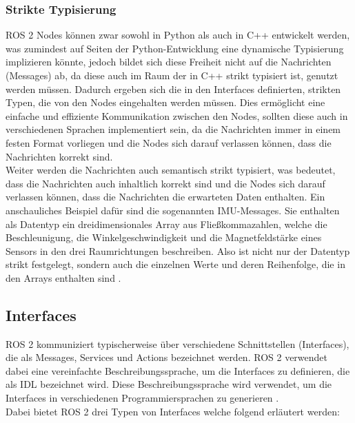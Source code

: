 \subsubsection{Strikte Typisierung}\label{subsubsec:ROS2StrikteTypisierung}
\ac{ROS} 2 Nodes können zwar sowohl in Python als auch in C++ entwickelt werden, was zumindest auf Seiten der Python-Entwicklung eine dynamische Typisierung implizieren könnte, jedoch bildet sich diese Freiheit nicht auf die Nachrichten (Messages) ab, da diese auch im Raum der in C++ strikt typisiert ist, genutzt werden müssen. Dadurch ergeben sich die in den Interfaces definierten, strikten Typen, die von den Nodes eingehalten werden müssen. Dies ermöglicht eine einfache und effiziente Kommunikation zwischen den Nodes, sollten diese auch in verschiedenen Sprachen implementiert sein, da die Nachrichten immer in einem festen Format vorliegen und die Nodes sich darauf verlassen können, dass die Nachrichten korrekt sind.\\
Weiter werden die Nachrichten auch semantisch strikt typisiert, was bedeutet, dass die Nachrichten auch inhaltlich korrekt sind und die Nodes sich darauf verlassen können, dass die Nachrichten die erwarteten Daten enthalten. Ein anschauliches Beispiel dafür sind die sogenannten \ac{IMU}-Messages. Sie enthalten als Datentyp ein dreidimensionales Array aus Fließkommazahlen, welche die Beschleunigung, die Winkelgeschwindigkeit und die Magnetfeldstärke eines Sensors in den drei Raumrichtungen beschreiben. Also ist nicht nur der Datentyp strikt festgelegt, sondern auch die einzelnen Werte und deren Reihenfolge, die in den Arrays enthalten sind \cite{ROSTopics}.\\

\subsection{Interfaces}\label{subsec:ROS2Interfaces}
\ac{ROS} 2 kommuniziert typischerweise über verschiedene Schnittstellen (Interfaces), die als Messages, Services und Actions bezeichnet werden. \ac{ROS} 2 verwendet dabei eine vereinfachte Beschreibungssprache, um die Interfaces zu definieren, die als \ac{IDL} bezeichnet wird. Diese Beschreibungssprache wird verwendet, um die Interfaces in verschiedenen Programmiersprachen zu generieren \cite{ROSInterfaces}.\\
Dabei bietet \ac{ROS} 2 drei Typen von Interfaces welche folgend erläutert werden:\\

